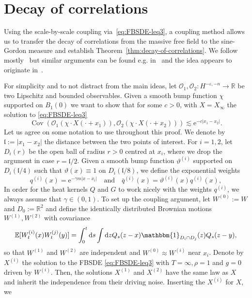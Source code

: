 \documentclass[11pt, a4paper]{scrartcl}
\numberwithin{equation}{section}
\theoremstyle{plain}
\theoremstyle{remark}
\newcommand{\assign}{:=}
\newcommand{\mathd}{\mathrm{d}}
\newcommand{\mathe}{\mathrm{e}}
\newcommand{\tmop}[1]{\ensuremath{\operatorname{#1}}}
\begin{document}
\section{Decay of correlations}\label{sec:correlations}
Using the scale-by-scale coupling via~\eqref{eq:FBSDE-leq3}, a coupling method
allows us to transfer the decay of correlations from the massive free field to
the sine-Gordon measure and establish Theorem~\ref{thm:decay-of-correlations}.
We follow mostly~{\cite{gubinelliDecayCorrelationsStochastic2025}} but similar
arguments can be found e.g.
in~{\cite{vecchiStochasticAnalysisSubcritical2025}} and the idea appears to
originate in~{\cite{funakiReversibleMeasuresMultidimensional1991}}.

For simplicity and to not distract from the main ideas, let $\mathcal{O}_1,
\mathcal{O}_2 : H^{- \varepsilon, - n} \rightarrow \mathbb{R}$ be two
Lipschitz and bounded observables. Given a smooth bump function $\chi$
supported on $B_1 (0)$ we want to show that for some $c>0$, with $X=X_\infty$
the solution to \eqref{eq:FBSDE-leq3}
\[ \tmop{Cov} (\mathcal{O}_1 (\chi \cdot X (\cdot + x_1)),
   \mathcal{O}_2 (\chi \cdot X(\cdot + x_2))) \lesssim \mathe^{- c | x_1 - x_2 |} .
\]
Let us agree on some notation to use throughout this proof. We denote by
$\mathfrak{l} \assign | x_1 - x_2 |$ the distance between the two points of
interest. For $i = 1, 2$, let $D_i (r)$ be the open ball of radius $r > 0$
centred at $x_i$, where we drop the argument in case $r =\mathfrak{l}/ 2$.
Given a smooth bump function $\vartheta^{(i)}$ supported on $D_i (\mathfrak{l}/ 4)$
such that $\vartheta (x) \equiv 1$ on $D_i (\mathfrak{l}/ 8)$, we define the
exponential weights
\[ q^{(i)} (x) = \mathe^{- \gamma m | x - x_i |}  \quad \text{and} \quad
   \bar{q}^{(i)} (x) = \vartheta^{(i)} (x) q^{(i)} (x), \]
In order for the heat kernels $Q$ and $G$ to work nicely with the weights
$q^{(i)}$, we always assume that $\gamma \in (0, 1)$. To set up the coupling
argument, let $W^{(0)} \assign W$ and $D_0 \assign \mathbb{R}^2$ and define
the identically distributed Brownian motions $W^{(1)}, W^{(2)}$ with
covariance
\[ \mathbb{E} [W_t^{(i)} (x) W_t^{(j)} (y)] = \int_0^t \mathd s \int \mathd z
   Q_s (z - x) \mathbbm{1}_{D_i \cap D_j} (z) Q_s (z - y), \]
so that $W^{(1)}$ and $W^{(2)}$ are independent and $W^{(0)} \approx W^{(i)}$
near $x_i$. Denote by $X^{(i)}$ the solution to the FBSDE
\eqref{eq:FBSDE-leq3} with $T = \infty, \rho = 1$ and $g = 0$ driven by
$W^{(i)}$. Then, the solutions $X^{(1)}$ and $X^{(2)}$ have the same law as $X$
and inherit the
independence from their driving noise. Inserting the $X^{(i)}$ for $X$, we
\end{document}
